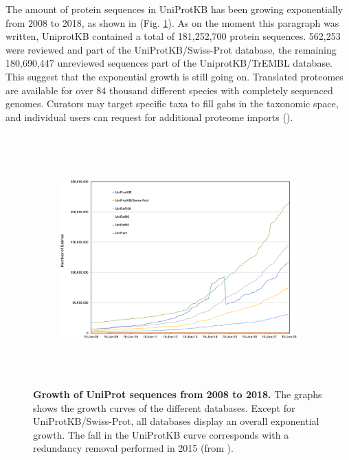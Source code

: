 The amount of protein sequences in UniProtKB has been growing exponentially from 2008 to 2018,
as shown in (Fig. \ref{fig:uniprot_growth}).
As on the moment this paragraph was written,
UniprotKB contained a total of 181,252,700 protein sequences.
562,253 were reviewed and part of the UniProtKB/Swiss-Prot database, 
the remaining 180,690,447 unreviewed sequences part of the UniprotKB/TrEMBL database.
This suggest that the exponential growth is still going on.
Translated proteomes are available for over 84 thousand different species with completely sequenced genomes.
Curators may target specific taxa to fill gabs in the taxonomic space,
and individual users can request for additional proteome imports
(\cite{uniprot2019}).


~\begin{figure}[h!]
	~\begin{subfigure}[b]{\linewidth}
		\includegraphics[width=\linewidth]
		{./literature_review/UniProtKB/database_growth/img/number_of_sequences.jpeg}
	~\end{subfigure}
	\caption{
		\textbf{Growth of UniProt sequences from 2008 to 2018.}	
		The graphs shows the growth curves of the different databases.
		Except for UniProtKB/Swiss-Prot, all databases display an overall exponential growth.
		The fall in the UniProtKB curve corresponds with a redundancy removal performed in 2015
		(from \cite{uniprot2019}).
		}
	\label{fig:uniprot_growth}
~\end{figure}

